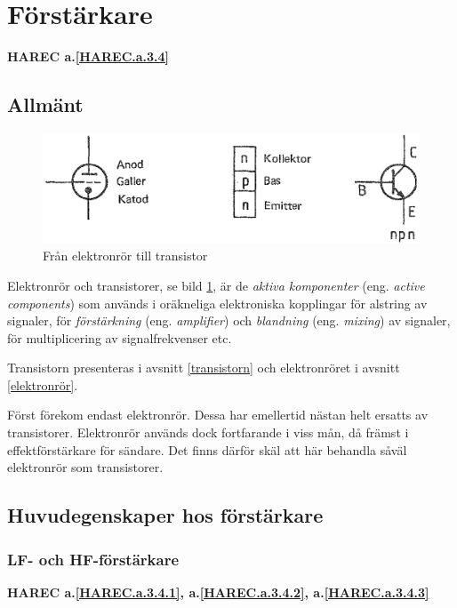 \section{Förstärkare}
\textbf{HAREC a.\ref{HAREC.a.3.4}\label{myHAREC.a.3.4}}

\subsection{Allmänt}

\begin{figure}
\includegraphics[width=\textwidth]{images/cropped_pdfs/bild_2_3-40.pdf}
\caption{Från elektronrör till transistor}
\label{fig:BildII3-40}
\end{figure}

Elektronrör och transistorer, se bild \ref{fig:BildII3-40}, är de
\emph{aktiva komponenter} (eng. \emph{active components}) som används i
oräkneliga elektroniska kopplingar för alstring av signaler, för
\emph{förstärkning} (eng. \emph{amplifier}) och \emph{blandning} (eng.
\emph{mixing}) av signaler, för multiplicering av signalfrekvenser etc.

Transistorn presenteras i avsnitt \ref{transistorn} och elektronröret i avsnitt \ref{elektronrör}.

Först förekom endast elektronrör.
Dessa har emellertid nästan helt ersatts av transistorer.
Elektronrör används dock fortfarande i viss mån, då främst i effektförstärkare
för sändare.
Det finns därför skäl att här behandla såväl elektronrör som transistorer.

\subsection{Huvudegenskaper hos förstärkare}
\subsubsection{LF- och HF-förstärkare}
\textbf{HAREC a.\ref{HAREC.a.3.4.1}, a.\ref{HAREC.a.3.4.2}, a.\ref{HAREC.a.3.4.3}\label{myHAREC.a.3.4.1}\label{myHAREC.a.3.4.2}\label{myHAREC.a.3.4.3}}

